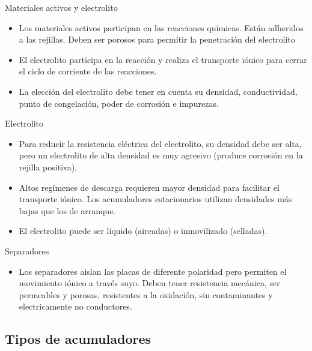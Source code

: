 \documentclass[xcolor={usenames,svgnames,dvipsnames}]{beamer}
\begin{document}
\begin{frame}[label=sec-2-5-3]{Materiales activos y electrolito}
\begin{itemize}
\item Los materiales activos participan en las reacciones químicas. Están \alert{adheridos a las rejillas}. Deben ser \alert{porosos} para permitir la
penetración del electrolito

\item El \alert{electrolito} participa en la reacción y \alert{realiza el transporte iónico} para cerrar el ciclo de corriente de las reacciones.

\item La \alert{elección del electrolito} debe tener en cuenta su \alert{densidad, conductividad, punto de congelación, poder de corrosión e impurezas}.
\end{itemize}
\end{frame}

\begin{frame}[label=sec-2-5-4]{Electrolito}
\begin{itemize}
\item \alert{Para reducir la resistencia eléctrica del electrolito, su densidad debe ser alta}, pero \alert{un electrolito de alta densidad es muy agresivo} (produce corrosión en la rejilla positiva).

\item Altos regímenes de descarga requieren mayor densidad para facilitar el transporte iónico. Los acumuladores estacionarios utilizan densidades más bajas que los de arranque.

\item El electrolito \alert{puede ser líquido} (aireadas) \alert{o inmovilizado} (selladas).
\end{itemize}
\end{frame}

\begin{frame}[label=sec-2-5-5]{Separadores}
\begin{itemize}
\item Los separadores \alert{aislan las placas de diferente polaridad pero permiten el movimiento iónico a través suyo}. Deben tener resistencia mecánica, ser permeables y porosas, resistentes a la oxidación, sin contaminantes y electricamente no conductores.
\end{itemize}
\end{frame}

\subsection{Tipos de acumuladores}
\label{sec-2-6}
\end{document}
